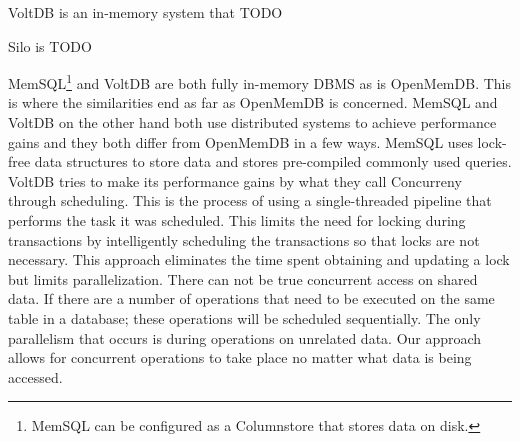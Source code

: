 \documentclass[conference, compsoc]{IEEEtran}
\begin{document}
VoltDB is an in-memory system that {{TODO}}

Silo is {{TODO}}

MemSQL\footnote{MemSQL can be configured as a Columnstore that stores data on disk.}
and VoltDB are both fully in-memory DBMS as is OpenMemDB. This is where the
similarities end as far as OpenMemDB is concerned. MemSQL and VoltDB on the other 
hand both use distributed systems to achieve performance gains and they both differ from 
OpenMemDB in a few ways. MemSQL uses lock-free data structures
to store data and stores pre-compiled commonly used queries\cite{MemSQL}.
VoltDB tries to make its performance gains by what they call Concurreny through
scheduling\cite{VoltDB}. This is the process of using a single-threaded pipeline 
that performs the task it was scheduled. This limits the need for locking during
transactions by intelligently scheduling the transactions so that locks are not
necessary. This approach eliminates the time spent obtaining and updating a lock
but limits parallelization. There can not be true concurrent access on shared data. If 
there are a number of operations that need to be executed on the same table in a database; 
these operations will be scheduled sequentially. The only parallelism that occurs is during
operations on unrelated data. Our approach allows for concurrent operations to take place
no matter what data is being accessed.
\end{document}
